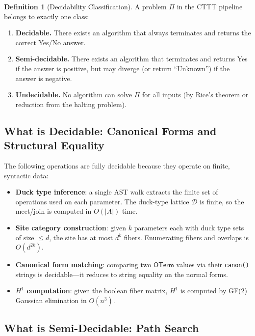 \documentclass[11pt,a4paper]{report}
\theoremstyle{definition}
\newtheorem{definition}{Definition}[chapter]
\theoremstyle{plain}
\newcommand{\Hone}{H^1}
\begin{document}
\begin{definition}[Decidability Classification]
\label{def:decidability}
A problem $\Pi$ in the CTTT pipeline belongs to exactly one class:
\begin{enumerate}
  \item \textbf{Decidable.} There exists an algorithm that always
    terminates and returns the correct Yes/No answer.
  \item \textbf{Semi-decidable.} There exists an algorithm that
    terminates and returns Yes if the answer is positive, but may
    diverge (or return ``Unknown'') if the answer is negative.
  \item \textbf{Undecidable.} No algorithm can solve $\Pi$ for all
    inputs (by Rice's theorem or reduction from the halting problem).
\end{enumerate}
\end{definition}

\subsection{What is Decidable: Canonical Forms and Structural Equality}

The following operations are fully decidable because they operate on
finite, syntactic data:

\begin{itemize}
  \item \textbf{Duck type inference}: a single AST walk extracts the
    finite set of operations used on each parameter.  The duck-type
    lattice $\mathcal{D}$ is finite, so the meet/join is computed in
    $O(|A|)$ time.
  \item \textbf{Site category construction}: given $k$ parameters each
    with duck type sets of size $\leq d$, the site has at most $d^k$
    fibers.  Enumerating fibers and overlaps is $O(d^{2k})$.
  \item \textbf{Canonical form matching}: comparing two
    $\mathsf{OTerm}$ values via their \texttt{canon()} strings is
    decidable---it reduces to string equality on the normal forms.
  \item \textbf{$\Hone$ computation}: given the boolean fiber matrix,
    $\Hone$ is computed by GF(2) Gaussian elimination in $O(n^3)$.
\end{itemize}

\subsection{What is Semi-Decidable: Path Search}
\end{document}

